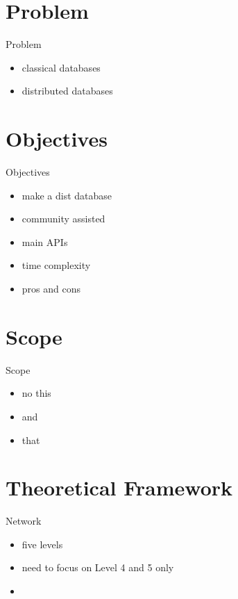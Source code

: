 \documentclass{beamer}
\begin{document}
\section{Problem}
\begin{frame}{Problem}
  \begin{itemize}   
    \item classical databases
    \item distributed databases
  \end{itemize}
\end{frame}

\section{Objectives}
\begin{frame}{Objectives}
  \begin{itemize}   
    \item make a dist database
    \item community assisted
    \item main APIs
    \item time complexity
    \item pros and cons
  \end{itemize}
\end{frame}

\section{Scope}
\begin{frame}{Scope}
  \begin{itemize}   
    \item no this
    \item and
    \item that
  \end{itemize}
\end{frame}


\section{Theoretical Framework}
\begin{frame}{Network}
  \begin{itemize}   
    \item five levels
    \item need to focus on Level 4 and 5 only
    \item 
  \end{itemize}
\end{frame}
\end{document}
